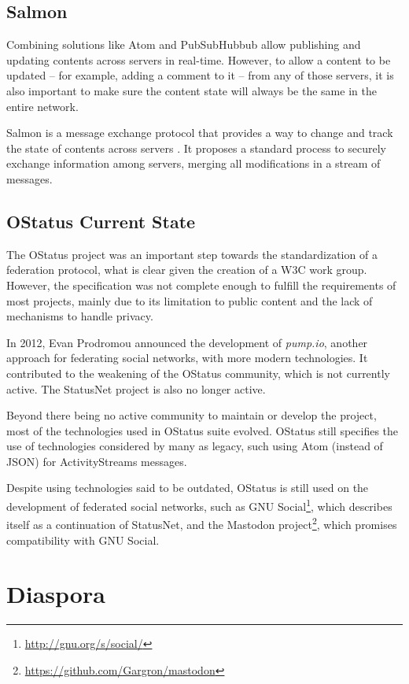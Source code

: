 \subsection{Salmon}

Combining solutions like Atom and PubSubHubbub allow publishing and
updating contents across servers in real-time. However, to allow a
content to be updated -- for example, adding a comment to it -- from any
of those servers, it is also important to make sure the content state
will always be the same in the entire network.

Salmon is a message exchange protocol that provides a way to change and
track the state of contents across servers \cite{salmon2009}. It proposes a
standard process to securely exchange information among servers, merging
all modifications in a stream of messages.

\subsection{OStatus Current State}

The OStatus project was an important step towards the standardization of
a federation protocol, what is clear given the creation of a W3C work
group.  However, the specification was not complete enough to fulfill
the requirements of most projects, mainly due to its limitation to
public content and the lack of mechanisms to handle privacy.

In 2012, Evan Prodromou announced the development of \textit{pump.io},
another approach for federating social networks, with more modern
technologies. It contributed to the weakening of the OStatus community,
which is not currently active. The StatusNet project is also no longer
active.

Beyond there being no active community to maintain or develop the
project, most of the technologies used in OStatus suite evolved. OStatus
still specifies the use of technologies considered by many as legacy,
such using Atom (instead of JSON) for ActivityStreams messages.

Despite using technologies said to be outdated, OStatus is still used on the
development of federated social networks, such as GNU
Social\footnote{\url{http://gnu.org/s/social/}}, which describes itself
as a continuation of StatusNet, and the Mastodon
project\footnote{\url{https://github.com/Gargron/mastodon}}, which promises
compatibility with GNU Social.

\section{Diaspora}

